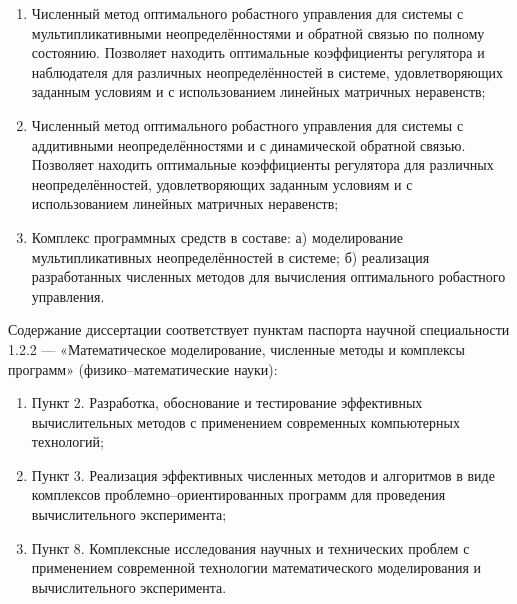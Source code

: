 {}

\begin{enumerate}[beginpenalty=10000] %
	\item Численный метод оптимального робастного управления для системы с мультипликативными неопределённостями и обратной связью по полному состоянию. Позволяет находить оптимальные коэффициенты регулятора и наблюдателя для различных неопределённостей в системе, удовлетворяющих заданным условиям и с использованием линейных матричных неравенств; 
	\item Численный метод оптимального робастного управления для системы с аддитивными неопределённостями и с динамической обратной связью. Позволяет находить оптимальные коэффициенты регулятора для различных неопределённостей, удовлетворяющих заданным условиям и с использованием линейных матричных неравенств; 
	\item Комплекс программных средств в составе: а) моделирование мультипликативных неопределённостей в системе; б) реализация разработанных численных методов для вычисления оптимального робастного управления. 
\end{enumerate}

{\compliances} 

Содержание диссертации соответствует пунктам паспорта научной специальности 1.2.2 --- «Математическое моделирование, численные методы и комплексы программ» (физико--математические науки):
\begin{enumerate}[beginpenalty=10000]
	\item Пункт 2. Разработка, обоснование и тестирование эффективных вычислительных методов с применением современных компьютерных технологий;
	\item Пункт 3. Реализация эффективных численных методов и алгоритмов в виде комплексов проблемно--ориентированных программ для проведения вычислительного эксперимента;
	\item Пункт 8. Комплексные исследования научных и технических проблем с применением современной технологии математического моделирования и вычислительного эксперимента.
\end{enumerate}

{\novelty}

